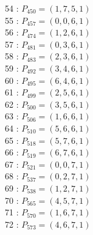 \documentclass{article}
\begin{document}
{\begin{multicols}{3}
54 : $P_{450}=( 1, 7, 5, 1 )$\\
55 : $P_{457}=( 0, 0, 6, 1 )$\\
56 : $P_{474}=( 1, 2, 6, 1 )$\\
57 : $P_{481}=( 0, 3, 6, 1 )$\\
58 : $P_{483}=( 2, 3, 6, 1 )$\\
59 : $P_{492}=( 3, 4, 6, 1 )$\\
60 : $P_{495}=( 6, 4, 6, 1 )$\\
61 : $P_{499}=( 2, 5, 6, 1 )$\\
62 : $P_{500}=( 3, 5, 6, 1 )$\\
63 : $P_{506}=( 1, 6, 6, 1 )$\\
64 : $P_{510}=( 5, 6, 6, 1 )$\\
65 : $P_{518}=( 5, 7, 6, 1 )$\\
66 : $P_{519}=( 6, 7, 6, 1 )$\\
67 : $P_{521}=( 0, 0, 7, 1 )$\\
68 : $P_{537}=( 0, 2, 7, 1 )$\\
69 : $P_{538}=( 1, 2, 7, 1 )$\\
70 : $P_{565}=( 4, 5, 7, 1 )$\\
71 : $P_{570}=( 1, 6, 7, 1 )$\\
72 : $P_{573}=( 4, 6, 7, 1 )$\\
\end{multicols}


%


%


}%
\end{document}
